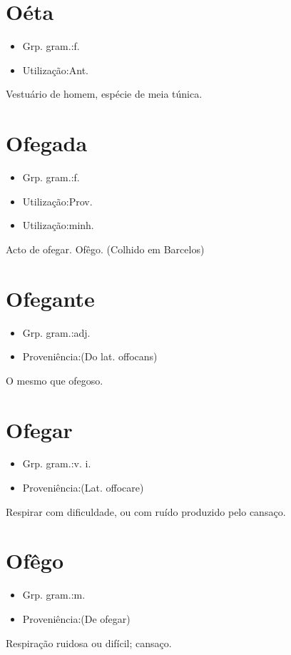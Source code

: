 \section{Oéta}
\begin{itemize}
\item {Grp. gram.:f.}
\end{itemize}
\begin{itemize}
\item {Utilização:Ant.}
\end{itemize}
Vestuário de homem, espécie de meia túnica.
\section{Ofegada}
\begin{itemize}
\item {Grp. gram.:f.}
\end{itemize}
\begin{itemize}
\item {Utilização:Prov.}
\end{itemize}
\begin{itemize}
\item {Utilização:minh.}
\end{itemize}
Acto de ofegar.
Ofêgo. (Colhido em Barcelos)
\section{Ofegante}
\begin{itemize}
\item {Grp. gram.:adj.}
\end{itemize}
\begin{itemize}
\item {Proveniência:(Do lat. \textunderscore offocans\textunderscore )}
\end{itemize}
O mesmo que \textunderscore ofegoso\textunderscore .
\section{Ofegar}
\begin{itemize}
\item {Grp. gram.:v. i.}
\end{itemize}
\begin{itemize}
\item {Proveniência:(Lat. \textunderscore offocare\textunderscore )}
\end{itemize}
Respirar com dificuldade, ou com ruído produzido pelo cansaço.
\section{Ofêgo}
\begin{itemize}
\item {Grp. gram.:m.}
\end{itemize}
\begin{itemize}
\item {Proveniência:(De \textunderscore ofegar\textunderscore )}
\end{itemize}
Respiração ruidosa ou difícil; cansaço.

